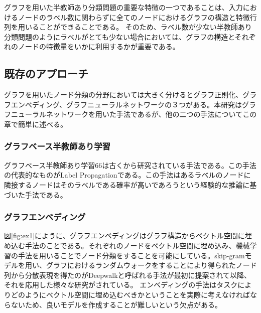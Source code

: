 グラフを用いた半教師あり分類問題の重要な特徴の一つであることは、入力におけるノードのラベル数に関わらずに全てのノードにおけるグラフの構造と特徴行列を用いることができることである。
そのため、ラベル数が少ない半教師あり分類問題のようにラベルがとても少ない場合においては、グラフの構造とそれぞれのノードの特徴量をいかに利用するかが重要である。

\subsection{既存のアプローチ}
グラフを用いたノード分類の分野においては大きく分けるとグラフ正則化、グラフエンベディング、グラフニューラルネットワークの３つがある。本研究はグラフニューラルネットワークを用いた手法であるが、他の二つの手法についてこの章で簡単に述べる。
\subsubsection{グラフベース半教師あり学習}
グラフベース半教師あり学習66は古くから研究されている手法である\cite{manireg}。この手法の代表的なものがLabel Propagation\cite{LP}である。この手法はあるラベルのノードに隣接するノードはそのラベルである確率が高いであろうという経験的な推論に基づいた手法である。
\subsubsection{グラフエンベディング}
図\ref{fig:ex1}にように、グラフエンベディングはグラフ構造からベクトル空間に埋め込む手法のことである。それぞれのノードをベクトル空間に埋め込み、機械学習の手法を用いることでノード分類をすることを可能にしている。skip-gramモデル\cite{skip-gram}を用い、グラフにおけるランダムウォークをすることにより得られたノード列から分散表現を得たのがDeepwalk\cite{DeepWalk}と呼ばれる手法が最初に提案されて以降、それを応用した様々な研究がされている\cite{LINE}\cite{node2vec}。
エンベディングの手法はタスクによりどのようにベクトル空間に埋め込むべきかということを実際に考えなければならないため、良いモデルを作成することが難しいという欠点がある。








